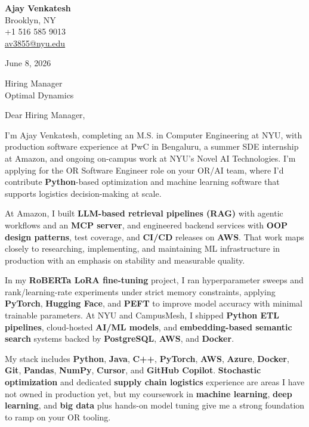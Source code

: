 \documentclass[letterpaper,11pt]{article}
\begin{document}
\begin{flushleft}
\textbf{\large Ajay Venkatesh} \\
Brooklyn, NY \\
+1 516 585 9013 \\
\href{mailto:av3855@nyu.edu}{av3855@nyu.edu}
\end{flushleft}
\vspace{10pt}
June 8, 2026
\vspace{6pt}

Hiring Manager \\
Optimal Dynamics

\vspace{10pt}

Dear Hiring Manager,

I'm Ajay Venkatesh, completing an M.S. in Computer Engineering at NYU, with production software experience at PwC in Bengaluru, a summer SDE internship at Amazon, and ongoing on-campus work at NYU's Novel AI Technologies. I'm applying for the OR Software Engineer role on your OR/AI team, where I'd contribute \textbf{Python}-based optimization and machine learning software that supports logistics decision-making at scale.

At Amazon, I built \textbf{LLM-based retrieval pipelines (RAG)} with agentic workflows and an \textbf{MCP server}, and engineered backend services with \textbf{OOP design patterns}, test coverage, and \textbf{CI/CD} releases on \textbf{AWS}. That work maps closely to researching, implementing, and maintaining ML infrastructure in production with an emphasis on stability and measurable quality.

In my \textbf{RoBERTa LoRA fine-tuning} project, I ran hyperparameter sweeps and rank/learning-rate experiments under strict memory constraints, applying \textbf{PyTorch}, \textbf{Hugging Face}, and \textbf{PEFT} to improve model accuracy with minimal trainable parameters. At NYU and CampusMesh, I shipped \textbf{Python ETL pipelines}, cloud-hosted \textbf{AI/ML models}, and \textbf{embedding-based semantic search} systems backed by \textbf{PostgreSQL}, \textbf{AWS}, and \textbf{Docker}.

My stack includes \textbf{Python}, \textbf{Java}, \textbf{C++}, \textbf{PyTorch}, \textbf{AWS}, \textbf{Azure}, \textbf{Docker}, \textbf{Git}, \textbf{Pandas}, \textbf{NumPy}, \textbf{Cursor}, and \textbf{GitHub Copilot}. \textbf{Stochastic optimization} and dedicated \textbf{supply chain logistics} experience are areas I have not owned in production yet, but my coursework in \textbf{machine learning}, \textbf{deep learning}, and \textbf{big data} plus hands-on model tuning give me a strong foundation to ramp on your OR tooling.
\end{document}
